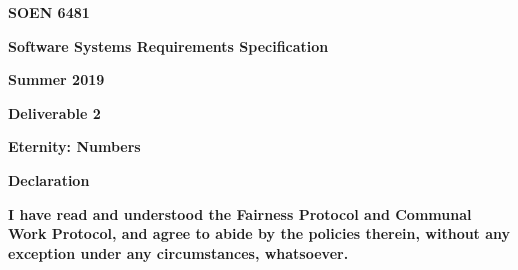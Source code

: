 \documentclass[12pt]{article}
\begin{document}
\begin{Center}
{\fontsize{15pt}{18.0pt}\selectfont \textbf{SOEN 6481}\par}
\end{Center}\par

\begin{Center}
{\fontsize{15pt}{18.0pt}\selectfont \textbf{Software Systems Requirements Specification}\par}
\end{Center}\par

\begin{Center}
{\fontsize{15pt}{18.0pt}\selectfont \textbf{Summer 2019}\par}
\end{Center}\par

\begin{Center}
{\fontsize{15pt}{18.0pt}\selectfont \textbf{Deliverable 2}\par}
\end{Center}\par

\begin{Center}
{\fontsize{15pt}{18.0pt}\selectfont \textbf{Eternity: Numbers}\par}
\end{Center}\par


\vspace{\baselineskip}
\begin{Center}
{\fontsize{15pt}{18.0pt}\selectfont \textbf{Declaration}\par}
\end{Center}\par


\vspace{\baselineskip}
\begin{justify}
{\fontsize{15pt}{18.0pt}\selectfont \textbf{I have read and understood the Fairness Protocol and Communal Work Protocol, and agree to abide by the policies therein, without any exception under any circumstances, whatsoever.}\par}
\end{justify}\par

\tab \tab 
\vspace{\baselineskip}
\vspace{\baselineskip}

\vspace{\baselineskip}
\end{document}
